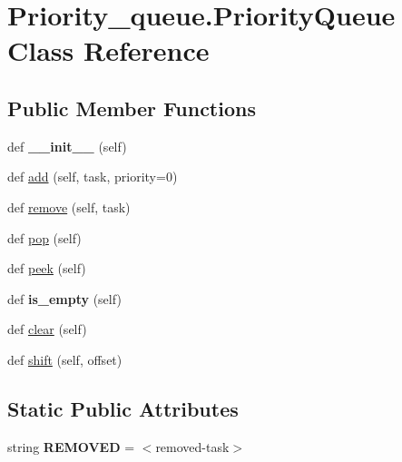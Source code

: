 \hypertarget{class_priority__queue_1_1_priority_queue}{}\section{Priority\+\_\+queue.\+Priority\+Queue Class Reference}
\label{class_priority__queue_1_1_priority_queue}
\subsection*{Public Member Functions}
\begin{DoxyCompactItemize}
\item 
\mbox{\label{class_priority__queue_1_1_priority_queue_aa64e91440263bad56792ef1a94ef8c60}} 
def {\bfseries \+\_\+\+\_\+init\+\_\+\+\_\+} (self)
\item 
def \hyperlink{class_priority__queue_1_1_priority_queue_a4655c59199cd1a181db01b265c0bd84d}{add} (self, task, priority=0)
\item 
def \hyperlink{class_priority__queue_1_1_priority_queue_a311e92d0a6c8a26393d9122b159d6b17}{remove} (self, task)
\item 
def \hyperlink{class_priority__queue_1_1_priority_queue_a27e13435b664d05b800751e19d46f21b}{pop} (self)
\item 
def \hyperlink{class_priority__queue_1_1_priority_queue_a4b386d64866a20d763f7b79a52885944}{peek} (self)
\item 
\mbox{\label{class_priority__queue_1_1_priority_queue_a9e12dce7378509e268c66bca36c68714}} 
def {\bfseries is\+\_\+empty} (self)
\item 
def \hyperlink{class_priority__queue_1_1_priority_queue_ad2dff608b7de6455848f3266557b0f17}{clear} (self)
\item 
def \hyperlink{class_priority__queue_1_1_priority_queue_a19c99c56b8204a717b12b3a32301a7d8}{shift} (self, offset)
\end{DoxyCompactItemize}
\subsection*{Static Public Attributes}
\begin{DoxyCompactItemize}
\item 
\mbox{\label{class_priority__queue_1_1_priority_queue_aad34a4d1ea26a02c02bb6bb5cf9c732a}} 
string {\bfseries R\+E\+M\+O\+V\+ED} = \textquotesingle{}$<$removed-\/task$>$\textquotesingle{}
\end{DoxyCompactItemize}


